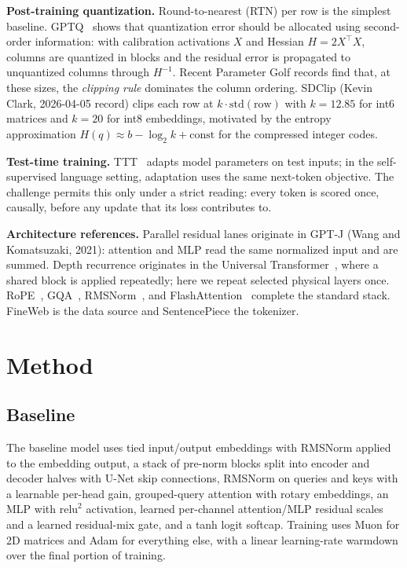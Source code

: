 \documentclass[10pt]{article}
\begin{document}
\textbf{Post-training quantization.} Round-to-nearest (RTN) per row is the simplest
baseline. GPTQ~\citep{frantar2023gptq} shows that quantization error should be allocated
using second-order information: with calibration activations $X$ and Hessian
$H=2X^\top X$, columns are quantized in blocks and the residual error is propagated to
unquantized columns through $H^{-1}$. Recent Parameter Golf records find that, at these
sizes, the \emph{clipping rule} dominates the column ordering. SDClip (Kevin Clark,
2026-04-05 record) clips each row at $k\cdot\mathrm{std}(\text{row})$ with $k=12.85$ for
int6 matrices and $k=20$ for int8 embeddings, motivated by the entropy approximation
$H(q)\approx b-\log_2 k+\text{const}$ for the compressed integer codes.

\textbf{Test-time training.} TTT~\citep{sun2024ttt} adapts model parameters on test
inputs; in the self-supervised language setting, adaptation uses the same next-token
objective. The challenge permits this only under a strict reading: every token is scored
once, causally, before any update that its loss contributes to.

\textbf{Architecture references.} Parallel residual lanes originate in GPT-J (Wang and
Komatsuzaki, 2021): attention and MLP read the same normalized input and are summed.
Depth recurrence originates in the Universal Transformer~\citep{dehghani2018ut}, where a
shared block is applied repeatedly; here we repeat selected physical layers once.
RoPE~\citep{su2021rope}, GQA~\citep{ainslie2023gqa}, RMSNorm~\citep{zhang2019rmsnorm},
and FlashAttention~\citep{dao2022flashattention} complete the standard stack. FineWeb
\citep{penedo2024fineweb} is the data source and SentencePiece
\citep{kudo2018sentencepiece} the tokenizer.

\section{Method}

\subsection{Baseline}
The baseline model uses tied input/output embeddings with RMSNorm applied to the
embedding output, a stack of pre-norm blocks split into encoder and decoder halves with
U-Net skip connections, RMSNorm on queries and keys with a learnable per-head gain,
grouped-query attention with rotary embeddings, an MLP with $\mathrm{relu}^2$ activation,
learned per-channel attention/MLP residual scales and a learned residual-mix gate, and a
tanh logit softcap. Training uses Muon for 2D matrices and Adam for everything else,
with a linear learning-rate warmdown over the final portion of training.
\end{document}
